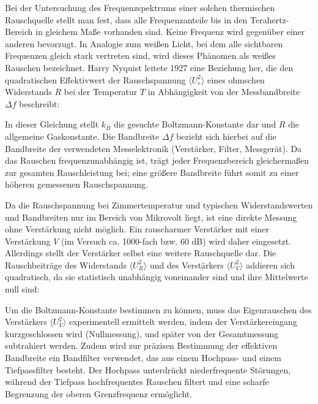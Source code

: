 
Bei der Untersuchung des Frequenzspektrums einer solchen thermischen Rauschquelle stellt man fest, dass alle Frequenzanteile bis in den Terahertz-Bereich in gleichem Maße vorhanden sind. Keine Frequenz wird gegenüber einer anderen bevorzugt. In Analogie zum weißen Licht, bei dem alle sichtbaren Frequenzen gleich stark vertreten sind, wird dieses Phänomen als weißes Rauschen bezeichnet. Harry Nyquist leitete 1927 eine Beziehung her, die den quadratischen Effektivwert der Rauschspannung $\langle U_r^2 \rangle$ eines ohmschen Widerstands $R$ bei der Temperatur $T$ in Abhängigkeit von der Messbandbreite $\Delta f$ beschreibt:


In dieser Gleichung stellt $k_B$ die gesuchte Boltzmann-Konstante dar und $R$ die allgemeine Gaskonstante. Die Bandbreite $\Delta f$ bezieht sich hierbei auf die Bandbreite der verwendeten Messelektronik (Verstärker, Filter, Messgerät). Da das Rauschen frequenzunabhängig ist, trägt jeder Frequenzbereich gleichermaßen zur gesamten Rauschleistung bei; eine größere Bandbreite führt somit zu einer höheren gemessenen Rauschspannung.

Da die Rauschspannung bei Zimmertemperatur und typischen Widerstandswerten und Bandbreiten nur im Bereich von Mikrovolt liegt, ist eine direkte Messung ohne Verstärkung nicht möglich. Ein rauscharmer Verstärker mit einer Verstärkung $V$ (im Versuch ca. 1000-fach bzw. 60 dB) wird daher eingesetzt. Allerdings stellt der Verstärker selbst eine weitere Rauschquelle dar. Die Rauschbeiträge des Widerstands $\langle U_R^2 \rangle$ und des Verstärkers $\langle U_V^2 \rangle$ addieren sich quadratisch, da sie statistisch unabhängig voneinander sind und ihre Mittelwerte null sind:


Um die Boltzmann-Konstante bestimmen zu können, muss das Eigenrauschen des Verstärkers $\langle U_V^2 \rangle$ experimentell ermittelt werden, indem der Verstärkereingang kurzgeschlossen wird (Nullmessung), und später von der Gesamtmessung subtrahiert werden. Zudem wird zur präzisen Bestimmung der effektiven Bandbreite ein Bandfilter verwendet, das aus einem Hochpass- und einem Tiefpassfilter besteht. Der Hochpass unterdrückt niederfrequente Störungen, während der Tiefpass hochfrequentes Rauschen filtert und eine scharfe Begrenzung der oberen Grenzfrequenz ermöglicht.

